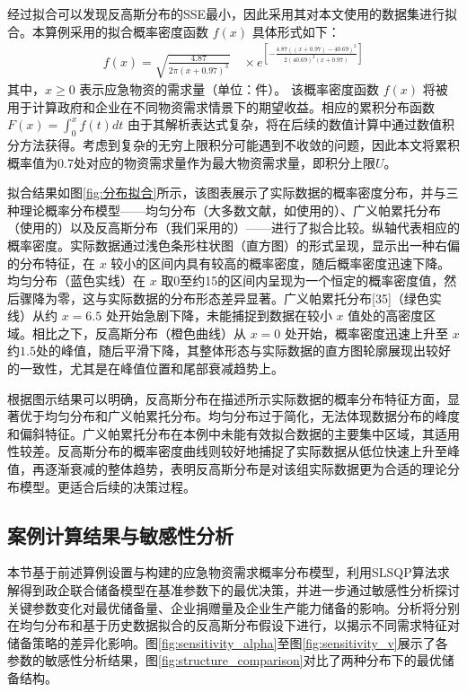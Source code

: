 \documentclass[a4paper,8pt,twocolumn]{article} %
\begin{document}
经过拟合可以发现反高斯分布的SSE最小，因此采用其对本文使用的数据集进行拟合。本算例采用的拟合概率密度函数 $f(x)$ 具体形式如下：
\begin{align}
\label{eq:pdf_demand}
f(x) = \sqrt{\frac{4.87}{2\pi (x + 0.97)^3}} \nonumber 
     \quad \times e^{\left[ -\frac{4.87 \left((x + 0.97) - 40.69\right)^2}{2(40.69)^2 (x + 0.97)} \right]}
\end{align}
其中，$x \ge 0$ 表示应急物资的需求量（单位：件）。
该概率密度函数 $f(x)$ 将被用于计算政府和企业在不同物资需求情景下的期望收益。相应的累积分布函数 $F(x) = \int_0^x f(t) dt$ 由于其解析表达式复杂，将在后续的数值计算中通过数值积分方法获得。考虑到复杂的无穷上限积分可能遇到不收敛的问题，因此本文将累积概率值为0.7处对应的物资需求量作为最大物资需求量，即积分上限$U$。

拟合结果如图\ref{fig:分布拟合}所示，该图表展示了实际数据的概率密度分布，并与三种理论概率分布模型——均匀分布（大多数文献，如\cite{LIY2023,zhengh2023,XTGL202004012}使用的）、广义帕累托分布（\cite{Li2022Stackelberg}使用的）以及反高斯分布（我们采用的）——进行了拟合比较。纵轴代表相应的概率密度。实际数据通过浅色条形柱状图（直方图）的形式呈现，显示出一种右偏的分布特征，在 $x$ 较小的区间内具有较高的概率密度，随后概率密度迅速下降。均匀分布（蓝色实线）在 $x$ 取0至约15的区间内呈现为一个恒定的概率密度值，然后骤降为零，这与实际数据的分布形态差异显著。广义帕累托分布[35]（绿色实线）从约 $x=6.5$ 处开始急剧下降，未能捕捉到数据在较小 $x$ 值处的高密度区域。相比之下，反高斯分布（橙色曲线）从 $x=0$ 处开始，概率密度迅速上升至 $x$ 约$1.5$处的峰值，随后平滑下降，其整体形态与实际数据的直方图轮廓展现出较好的一致性，尤其是在峰值位置和尾部衰减趋势上。

根据图示结果可以明确，反高斯分布在描述所示实际数据的概率分布特征方面，显著优于均匀分布和广义帕累托分布。均匀分布过于简化，无法体现数据分布的峰度和偏斜特征。广义帕累托分布在本例中未能有效拟合数据的主要集中区域，其适用性较差。反高斯分布的概率密度曲线则较好地捕捉了实际数据从低位快速上升至峰值，再逐渐衰减的整体趋势，表明反高斯分布是对该组实际数据更为合适的理论分布模型。更适合后续的决策过程。

\subsection{案例计算结果与敏感性分析}
本节基于前述算例设置与构建的应急物资需求概率分布模型，利用SLSQP算法求解得到政企联合储备模型在基准参数下的最优决策，并进一步通过敏感性分析探讨关键参数变化对最优储备量、企业捐赠量及企业生产能力储备的影响。分析将分别在均匀分布和基于历史数据拟合的反高斯分布假设下进行，以揭示不同需求特征对储备策略的差异化影响。图\ref{fig:sensitivity_alpha}至图\ref{fig:sensitivity_v}展示了各参数的敏感性分析结果，图\ref{fig:structure_comparison}对比了两种分布下的最优储备结构。
\end{document}
